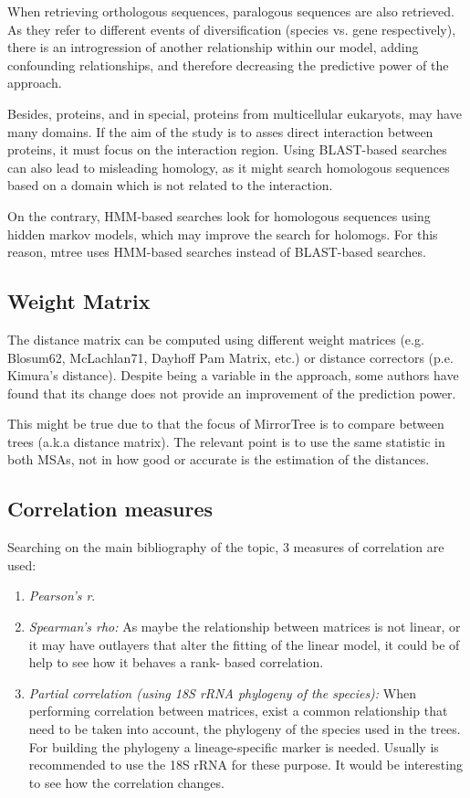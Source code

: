 \documentclass[11pt]{article}
\begin{document}
When retrieving orthologous sequences, paralogous sequences are also retrieved. As they refer to different events of diversification (species vs. gene respectively), there is an introgression of another relationship within our model, adding confounding relationships, and therefore decreasing the predictive power of the approach.

Besides, proteins, and in special, proteins from multicellular eukaryots, may have many domains. If the aim of the study is to asses direct interaction between proteins, it must focus on the interaction region. Using BLAST-based searches can also lead to misleading homology, as it might search homologous sequences based on a domain which is not related to the interaction.

On the contrary, HMM-based searches look for homologous sequences using hidden markov models, which may improve the search for holomogs. For this reason, mtree uses HMM-based searches instead of BLAST-based searches.

\subsection{Weight Matrix}
The distance matrix can be computed using different weight matrices (e.g. Blosum62, McLachlan71, Dayhoff Pam Matrix, etc.) or distance correctors (p.e. Kimura's distance). Despite being a variable in the approach, some authors\cite{Zhou13} have found that its change does not provide an improvement of the prediction power.

This might be true due to that the focus of MirrorTree is to compare between trees (a.k.a distance matrix). The relevant point is to use the same statistic in both MSAs, not in how good or accurate is the estimation of the distances.

\subsection{Correlation measures}
Searching on the main bibliography of the topic, 3 measures of correlation are used:

\begin{enumerate}
\setlength{\itemsep}{1pt}
	\item \textit{Pearson's r}\cite{Pazos2001}.
	\item \textit{Spearman's rho:} As maybe the relationship between matrices is not linear, or it may have 		outlayers that alter the fitting of the linear model, it could be of help to see how it behaves a rank-		based correlation.
	\item \textit{Partial correlation (using 18S rRNA phylogeny of the species):}\cite{Sato2005} When 			performing correlation between matrices, exist a common relationship that need to be taken into account, 		the phylogeny of the species used in the trees. For building the phylogeny a lineage-specific marker is 		needed. Usually is recommended to use the 18S rRNA for these purpose\cite{Sato2005}. It would be 				interesting to see how the correlation changes.
\end{enumerate}
\end{document}
